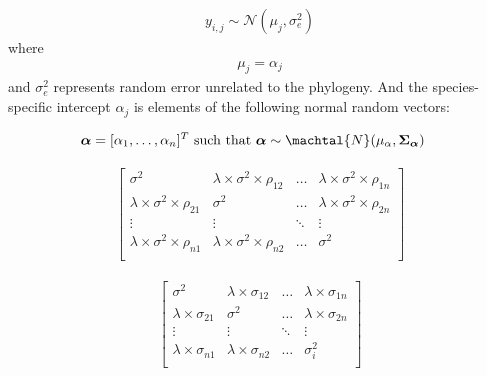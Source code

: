 \documentclass[11pt]{article}
\begin{document}

\renewcommand{\refname}{\CHead{}}

\setlength{\parindent}{0cm}
\setlength{\parskip}{5pt}


\begin{align}
  \label{modely}
  y_{i,j} \sim \mathcal{N}(\mu_j, \sigma_e^2)
\end{align}
where
\begin{align}
  \label{modelmu}
  \mu_j = \alpha_j 
  \end{align}
and $\sigma_e^2$ represents random error unrelated to the phylogeny. And the species-specific intercept $\alpha_j$ is elements of the following normal random vectors:

\begin{align}
    \label{phybetas}
  \boldsymbol{\alpha} = [\alpha_1, \ldots, \alpha_n]^T & \text{ such that }
  \boldsymbol{\alpha} \sim \machtal{N}(\mu_{\alpha},\boldsymbol{\Sigma_{\alpha}}) 
\end{align}


\begin{align}
  \label{phymatnew}
\begin{bmatrix}
  \sigma^2 & \lambda \times \sigma^2 \times \rho_{12} & \ldots & \lambda \times \sigma^2 \times \rho_{1n} \\
  \lambda \times \sigma^2 \times \rho_{21} & \sigma^2 & \ldots & \lambda \times \sigma^2 \times \rho_{2n} \\
  \vdots & \vdots & \ddots & \vdots \\
  \lambda \times \sigma^2 \times \rho_{n1} & \lambda \times \sigma^2 \times \rho_{n2} & \ldots & \sigma^2\\
\end{bmatrix}
\end{align}

\begin{align}
  \label{phymatalt}
\begin{bmatrix}
  \sigma^2 & \lambda \times \sigma_{12} & \ldots & \lambda \times \sigma_{1n} \\
  \lambda \times \sigma_{21} & \sigma^2 & \ldots & \lambda \times \sigma_{2n} \\
  \vdots & \vdots & \ddots & \vdots \\
  \lambda \times \sigma_{n1} & \lambda \times \sigma_{n2} & \ldots & \sigma^2_i \\
\end{bmatrix}
\end{align}
\end{document}

